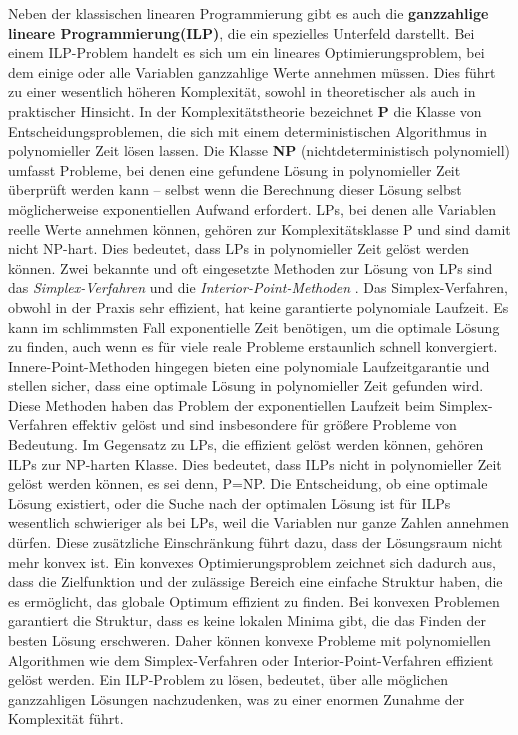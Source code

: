 \documentclass[bachelor, german]{algothesis}
\begin{document}
Neben der klassischen linearen Programmierung gibt es auch die \textbf{ganzzahlige lineare Programmierung(ILP)}, die ein spezielles Unterfeld darstellt. Bei einem ILP-Problem handelt es sich um ein lineares Optimierungsproblem, bei dem einige oder alle Variablen ganzzahlige Werte annehmen müssen. Dies führt zu einer wesentlich höheren Komplexität, sowohl in theoretischer als auch in praktischer Hinsicht.\newline
In der Komplexitätstheorie bezeichnet \textbf{P}  die Klasse von Entscheidungsproblemen, die sich mit einem deterministischen Algorithmus in polynomieller Zeit lösen lassen. Die Klasse \textbf{NP} (nichtdeterministisch polynomiell) umfasst Probleme, bei denen eine gefundene Lösung in polynomieller Zeit überprüft werden kann – selbst wenn die Berechnung dieser Lösung selbst möglicherweise exponentiellen Aufwand erfordert.\newline
LPs, bei denen alle Variablen reelle Werte annehmen können, gehören zur Komplexitätsklasse P und sind damit nicht NP-hart. Dies bedeutet, dass LPs in polynomieller Zeit gelöst werden können. Zwei bekannte und oft eingesetzte Methoden zur Lösung von LPs sind das \emph{Simplex-Verfahren} und die \emph{Interior-Point-Methoden} \cite{LinearProg}.  Das Simplex-Verfahren, obwohl in der Praxis sehr effizient, hat keine garantierte polynomiale Laufzeit. Es kann im schlimmsten Fall exponentielle Zeit benötigen, um die optimale Lösung zu finden, auch wenn es für viele reale Probleme erstaunlich schnell konvergiert. Innere-Point-Methoden hingegen bieten eine polynomiale Laufzeitgarantie und stellen sicher, dass eine optimale Lösung in polynomieller Zeit gefunden wird. Diese Methoden haben das Problem der exponentiellen Laufzeit beim Simplex-Verfahren effektiv gelöst und sind insbesondere für größere Probleme von Bedeutung.\newline
Im Gegensatz zu LPs, die effizient gelöst werden können, gehören ILPs zur NP-harten Klasse. Dies bedeutet, dass ILPs nicht in polynomieller Zeit gelöst werden können, es sei denn, P=NP. Die Entscheidung, ob eine optimale Lösung existiert, oder die Suche nach der optimalen Lösung ist für ILPs wesentlich schwieriger als bei LPs, weil die Variablen nur ganze Zahlen annehmen dürfen. Diese zusätzliche Einschränkung führt dazu, dass der Lösungsraum nicht mehr konvex ist. Ein konvexes Optimierungsproblem zeichnet sich dadurch aus, dass die Zielfunktion und der zulässige Bereich eine einfache Struktur haben, die es ermöglicht, das globale Optimum effizient zu finden. Bei konvexen Problemen garantiert die Struktur, dass es keine lokalen Minima gibt, die das Finden der besten Lösung erschweren. Daher können konvexe Probleme mit polynomiellen Algorithmen wie dem Simplex-Verfahren oder Interior-Point-Verfahren effizient gelöst werden. Ein ILP-Problem zu lösen, bedeutet, über alle möglichen ganzzahligen Lösungen nachzudenken, was zu einer enormen Zunahme der Komplexität führt.\newline
\end{document}
